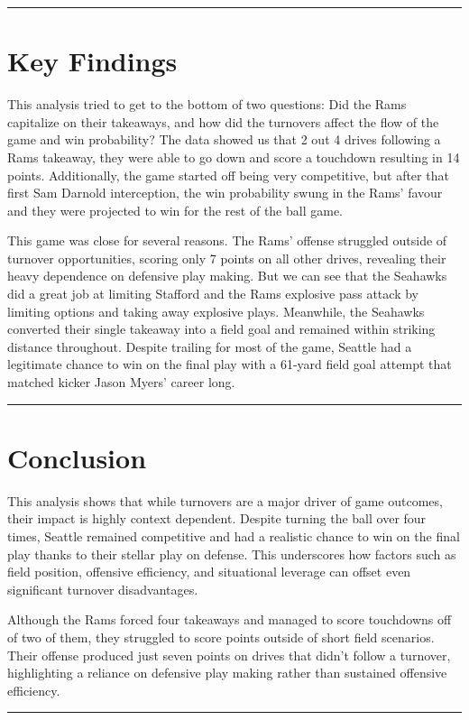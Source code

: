 \documentclass[
]{article}
\begin{document}
\begin{center}\rule{0.5\linewidth}{0.5pt}\end{center}

\section{Key Findings}\label{key-findings}

This analysis tried to get to the bottom of two questions: Did the Rams
capitalize on their takeaways, and how did the turnovers affect the flow
of the game and win probability? The data showed us that 2 out 4 drives
following a Rams takeaway, they were able to go down and score a
touchdown resulting in 14 points. Additionally, the game started off
being very competitive, but after that first Sam Darnold interception,
the win probability swung in the Rams' favour and they were projected to
win for the rest of the ball game.

This game was close for several reasons. The Rams' offense struggled
outside of turnover opportunities, scoring only 7 points on all other
drives, revealing their heavy dependence on defensive play making. But
we can see that the Seahawks did a great job at limiting Stafford and
the Rams explosive pass attack by limiting options and taking away
explosive plays. Meanwhile, the Seahawks converted their single takeaway
into a field goal and remained within striking distance throughout.
Despite trailing for most of the game, Seattle had a legitimate chance
to win on the final play with a 61-yard field goal attempt that matched
kicker Jason Myers' career long.

\begin{center}\rule{0.5\linewidth}{0.5pt}\end{center}

\section{Conclusion}\label{conclusion}

This analysis shows that while turnovers are a major driver of game
outcomes, their impact is highly context dependent. Despite turning the
ball over four times, Seattle remained competitive and had a realistic
chance to win on the final play thanks to their stellar play on defense.
This underscores how factors such as field position, offensive
efficiency, and situational leverage can offset even significant
turnover disadvantages.

Although the Rams forced four takeaways and managed to score touchdowns
off of two of them, they struggled to score points outside of short
field scenarios. Their offense produced just seven points on drives that
didn't follow a turnover, highlighting a reliance on defensive play
making rather than sustained offensive efficiency.

\begin{center}\rule{0.5\linewidth}{0.5pt}\end{center}
\end{document}
